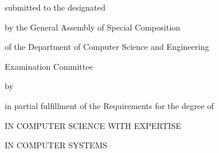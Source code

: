 \thispagestyle{empty}
\makeatletter
{\LARGE \@title}
\par
\vspace{2.5cm} {\Large \csethesisTypeEn}

\vspace{1.25cm} {\Large submitted to the designated}

\vspace{0.75cm} {\Large by the General Assembly of Special Composition}

\vspace{0.25cm} {\Large of the Department of Computer Science and Engineering}

\vspace{0.25cm} {\Large Examination Committee}

\vspace{1.25cm} {\Large by}

\vspace{1.75cm} {\LARGE \@author}

\vspace{1.25cm} {\Large in partial fulfillment of the Requirements for the degree of}

\vspace{1.75cm} {\Large \csediplwmaEn}

\vspace{0.5cm} {\Large IN COMPUTER SCIENCE WITH EXPERTISE}

\vspace{0.5cm} {\Large IN COMPUTER SYSTEMS}
\par
\vfill {\Large \@date}
\clearpage
